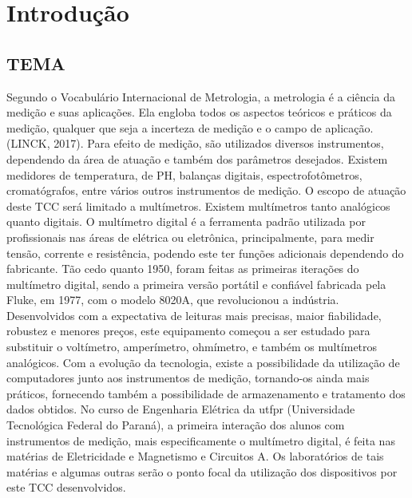 
\chapter{Introdução}\label{cap:introducao}

\section{TEMA}\label{sec:tema}
Segundo o Vocabulário Internacional de Metrologia, a metrologia é a ciência da medição e suas aplicações. Ela engloba todos os aspectos teóricos e práticos da medição, qualquer que seja a incerteza de medição e o campo de aplicação. (LINCK, 2017).
Para efeito de medição, são utilizados diversos instrumentos, dependendo da área de atuação e também dos parâmetros desejados. Existem medidores de temperatura, de PH, balanças digitais, espectrofotômetros, cromatógrafos, entre vários outros instrumentos de medição. O escopo de atuação deste \gls{TCC} será limitado a multímetros. Existem multímetros tanto analógicos quanto digitais.
O multímetro digital é a ferramenta padrão utilizada por profissionais nas áreas de elétrica ou eletrônica, principalmente, para medir tensão, corrente e resistência, podendo este ter funções adicionais dependendo do fabricante.
	Tão cedo quanto 1950, foram feitas as primeiras iterações do multímetro digital, sendo a primeira versão portátil e confiável fabricada pela Fluke, em 1977, com o modelo 8020A, que revolucionou a indústria. Desenvolvidos com a expectativa de leituras mais precisas, maior fiabilidade, robustez e menores preços, este equipamento começou a ser estudado para substituir o voltímetro, amperímetro, ohmímetro, e também os multímetros analógicos. 
	Com a evolução da tecnologia, existe a possibilidade da utilização de computadores junto aos instrumentos de medição, tornando-os ainda mais práticos, fornecendo também a possibilidade de armazenamento e tratamento dos dados obtidos.
	No curso de Engenharia Elétrica da \gls{utfpr} (Universidade Tecnológica Federal do Paraná), a primeira interação dos alunos com instrumentos de medição, mais especificamente o multímetro digital, é feita nas matérias de Eletricidade e Magnetismo e Circuitos A. Os laboratórios de tais matérias e algumas outras serão o ponto focal da utilização dos dispositivos por este \gls{TCC} desenvolvidos.

